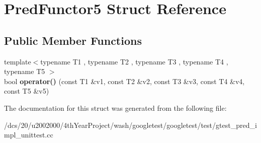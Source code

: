 \hypertarget{structPredFunctor5}{}\section{Pred\+Functor5 Struct Reference}
\label{structPredFunctor5}
\subsection*{Public Member Functions}
\begin{DoxyCompactItemize}
\item 
\mbox{\label{structPredFunctor5_af9decf4d509848479ccdc4fe90129a06}} 
{\footnotesize template$<$typename T1 , typename T2 , typename T3 , typename T4 , typename T5 $>$ }\\bool {\bfseries operator()} (const T1 \&v1, const T2 \&v2, const T3 \&v3, const T4 \&v4, const T5 \&v5)
\end{DoxyCompactItemize}


The documentation for this struct was generated from the following file\+:\begin{DoxyCompactItemize}
\item 
/dcs/20/u2002000/4th\+Year\+Project/wash/googletest/googletest/test/gtest\+\_\+pred\+\_\+impl\+\_\+unittest.\+cc\end{DoxyCompactItemize}
